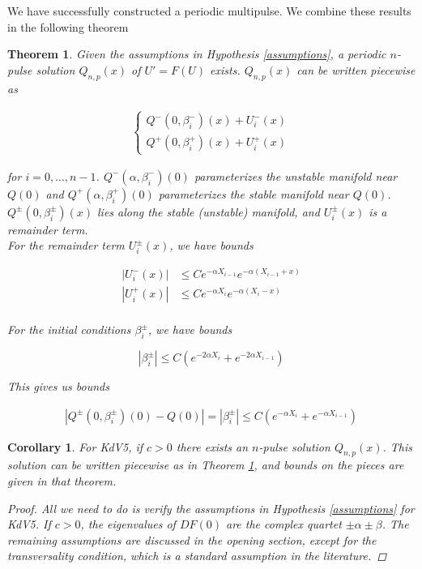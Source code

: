 \documentclass[12pt]{article}
\newtheorem{theorem}{Theorem}
\newtheorem{corollary}{Corollary}
\begin{document}
We have successfully constructed a periodic multipulse. We combine these results in the following theorem


\begin{theorem}\label{2pconstruction}
Given the assumptions in Hypothesis \ref{assumptions}, a periodic $n$-pulse solution $Q_{n,p}(x)$ of $U' = F(U)$ exists. $Q_{n, p}(x)$ can be written piecewise as

\begin{align*}
\begin{cases}
Q^-(0, \beta_i^-)(x) + U_i^-(x) \\
Q^+(0, \beta_i^+)(x) + U_i^+(x)
\end{cases}
\end{align*}

for $i = 0, \dots, n-1$. $Q^-(\alpha, \beta_i^-)(0)$ parameterizes the unstable manifold near $Q(0)$ and $Q^+(\alpha, \beta_i^+)(0)$ parameterizes the stable manifold near $Q(0)$. $Q^\pm(0, \beta_i^\pm)(x)$ lies along the stable (unstable) manifold, and $U_i^\pm(x)$ is a remainder term.\\

For the remainder term $U_i^\pm(x)$, we have bounds

\begin{align*}
|U_i^-(x)| &\leq C e^{-\alpha X_{i-1}} e^{-\alpha(X_{i-1} + x)} \\
|U_i^+(x)| &\leq C e^{-\alpha X_i} e^{-\alpha(X_i - x)} \\
\end{align*}

For the initial conditions $\beta_i^\pm$, we have bounds

\begin{equation}
| \beta_i^\pm | \leq C (e^{-2 \alpha X_i} + e^{-2 \alpha X_{i-1}})
\end{equation}

This gives us bounds

\begin{align*}
|Q^\pm(0, \beta_i^\pm)(0) - Q(0)| = |\beta_i^\pm| \leq 
C \left( e^{-\alpha X_i} + e^{-\alpha X_{i-1}} \right)
\end{align*}

\end{theorem}


\begin{corollary}
For KdV5, if $c > 0$ there exists an $n$-pulse solution $Q_{n, p}(x)$. This solution can be written piecewise as in Theorem \ref{2pconstruction}, and bounds on the pieces are given in that theorem.

\begin{proof}
All we need to do is verify the assumptions in Hypothesis \ref{assumptions} for KdV5. If $c > 0$, the eigenvalues of $DF(0)$ are the complex quartet $\pm \alpha \pm \beta$. The remaining assumptions are discussed in the opening section, except for the transversality condition, which is a standard assumption in the literature.
\end{proof}

\end{corollary}
\end{document}
